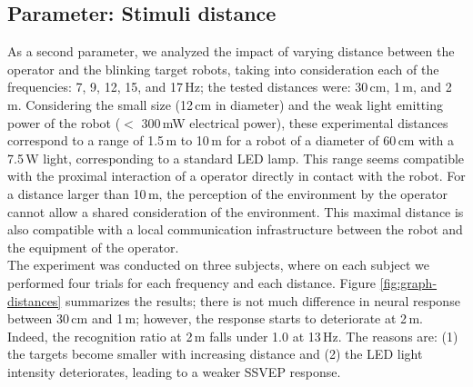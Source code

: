 \documentclass[smallextended]{svjour3}
\begin{document}
\subsection{Parameter: Stimuli distance}
As a second parameter, we analyzed the impact of varying distance between the operator and the blinking target robots, taking into consideration each of the frequencies: 7, 9, 12, 15, and 17\,Hz; the tested distances were: 30\,cm, 1\,m, and 2\,m. 
Considering the small size (12\,cm in diameter) and the weak light emitting power of the robot ($<$ 300\,mW electrical power), these experimental distances correspond to a range of 1.5\,m to 10\,m for a robot of a diameter of 60\,cm with a 7.5\,W light, corresponding to a standard LED lamp. 
This range seems compatible with the proximal interaction of a operator directly in contact with the robot. For a distance larger than 10\,m, the perception of the environment by the operator cannot allow a shared consideration of the environment. This maximal distance is also compatible with a local communication infrastructure between the robot and the equipment of the operator.\\
The experiment was conducted on three subjects, where on each subject we performed four trials for each frequency and each distance. 
Figure \ref{fig:graph-distances} summarizes the results; there is not much difference in neural response between 30\,cm and 1\,m; however, the response starts to deteriorate at 2\,m. Indeed, the recognition ratio at 2\,m falls under 1.0 at 13\,Hz. 
The reasons are: (1) the targets become smaller with increasing distance and (2) the LED light intensity deteriorates, leading to a weaker SSVEP response.
\end{document}
